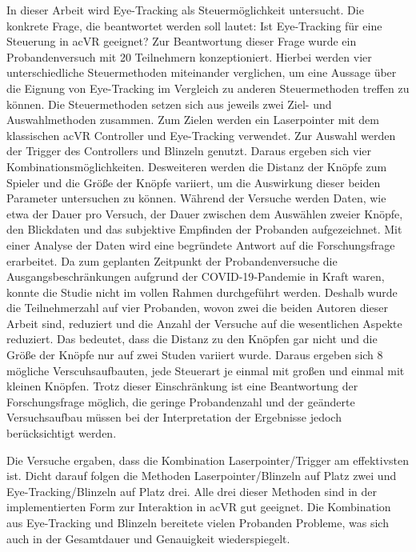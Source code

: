 In dieser Arbeit wird Eye-Tracking als Steuermöglichkeit untersucht. Die konkrete Frage, die beantwortet werden soll lautet: \glqq Ist Eye-Tracking für eine Steuerung in ac{VR} geeignet?\grqq{} Zur Beantwortung dieser Frage wurde ein Probandenversuch mit 20 Teilnehmern konzeptioniert. Hierbei werden vier unterschiedliche Steuermethoden miteinander verglichen, um eine Aussage über die Eignung von Eye-Tracking im Vergleich zu anderen Steuermethoden treffen zu können. Die Steuermethoden setzen sich aus jeweils zwei Ziel- und Auswahlmethoden zusammen. Zum Zielen werden ein Laserpointer mit dem klassischen ac{VR} Controller und Eye-Tracking verwendet. Zur Auswahl werden der Trigger des Controllers und Blinzeln genutzt. Daraus ergeben sich vier Kombinationsmöglichkeiten. Desweiteren werden die Distanz der Knöpfe zum Spieler und die Größe der Knöpfe variiert, um die Auswirkung dieser beiden Parameter untersuchen zu können. Während der Versuche werden Daten, wie etwa der Dauer pro Versuch, der Dauer zwischen dem Auswählen zweier Knöpfe, den Blickdaten und das subjektive Empfinden der Probanden aufgezeichnet. Mit einer Analyse der Daten wird eine begründete Antwort auf die Forschungsfrage erarbeitet. Da zum geplanten Zeitpunkt der Probandenversuche die Ausgangsbeschränkungen aufgrund der \ac{COVID-19}-Pandemie in Kraft waren, konnte die Studie nicht im vollen Rahmen durchgeführt werden. Deshalb wurde die Teilnehmerzahl auf vier Probanden, wovon zwei die beiden Autoren dieser Arbeit sind, reduziert und die Anzahl der Versuche auf die wesentlichen Aspekte reduziert. Das bedeutet, dass die Distanz zu den Knöpfen gar nicht und die Größe der Knöpfe nur auf zwei Studen variiert wurde. Daraus ergeben sich 8 mögliche Verscuhsaufbauten, jede Steuerart je einmal mit großen und einmal mit kleinen Knöpfen. Trotz dieser Einschränkung ist eine Beantwortung der Forschungsfrage möglich, die geringe Probandenzahl und der geänderte Versuchsaufbau müssen bei der Interpretation der Ergebnisse jedoch berücksichtigt werden. 

Die Versuche ergaben, dass die Kombination Laserpointer/Trigger am effektivsten ist. Dicht darauf folgen die Methoden Laserpointer/Blinzeln auf Platz zwei und Eye-Tracking/Blinzeln auf Platz drei. Alle drei dieser Methoden sind in der implementierten Form zur Interaktion in ac{VR} gut geeignet. Die Kombination aus Eye-Tracking und Blinzeln bereitete vielen Probanden Probleme, was sich auch in der Gesamtdauer und Genauigkeit wiederspiegelt. 
